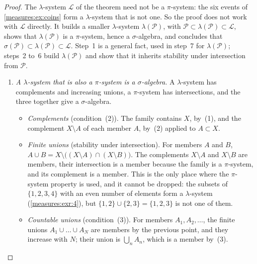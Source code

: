 \begin{notechapter}
\begin{proof}
The $\lambda$-system $\mathcal L$ of the theorem need not be a
$\pi$-system: the six events of \cref{measures:ex:coins} form a
$\lambda$-system that is not one. So the proof does not work with
$\mathcal L$ directly. It builds a smaller $\lambda$-system
$\lambda(\mathcal P)$, with
$\mathcal P\subset\lambda(\mathcal P)\subset\mathcal L$, shows that
$\lambda(\mathcal P)$ is a $\pi$-system, hence a $\sigma$-algebra, and
concludes that
$\sigma(\mathcal P)\subset\lambda(\mathcal P)\subset\mathcal L$.
Step~1 is a general fact, used in step~7 for $\lambda(\mathcal P)$;
steps~2 to~6 build $\lambda(\mathcal P)$ and show that it inherits
stability under intersection from $\mathcal P$.
\begin{enumerate}[nosep]
  \item \emph{A $\lambda$-system that is also a $\pi$-system is a
        $\sigma$-algebra.} A $\lambda$-system has complements and
        increasing unions, a $\pi$-system has intersections, and the
        three together give a $\sigma$-algebra.
        \begin{itemize}[nosep]
          \item \emph{Complements} (condition~(2)). The family contains
                $X$, by~(1), and the complement $X\setminus A$ of each
                member $A$, by~(2) applied to $A\subset X$.
          \item \emph{Finite unions} (stability under intersection).
                For members $A$ and $B$,
                $A\cup B = X\setminus\bigl((X\setminus A)\cap(X\setminus
                B)\bigr)$. The complements $X\setminus A$ and
                $X\setminus B$ are members, their intersection is a
                member because the family is a $\pi$-system, and its
                complement is a member. This is the only place where the
                $\pi$-system property is used, and it cannot be dropped:
                the subsets of $\{1, 2, 3, 4\}$ with an even number of
                elements form a $\lambda$-system
                (\cref{measures:exr:4}), but $\{1, 2\}\cup\{2, 3\} =
                \{1, 2, 3\}$ is not one of them.
          \item \emph{Countable unions} (condition~(3)). For members
                $A_1, A_2, \dots$, the finite unions
                $A_1\cup\dots\cup A_N$ are members by the previous point,
                and they increase with $N$; their union is
                $\bigcup_nA_n$, which is a member by~(3).
        \end{itemize}

\end{enumerate}
\end{proof}
\end{notechapter}
